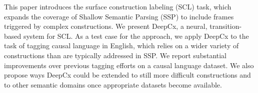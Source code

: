 This paper introduces the surface construction labeling (SCL) task, which expands the coverage of Shallow Semantic Parsing (SSP) to include frames triggered by complex constructions. We present DeepCx, a neural, transition-based system for SCL. As a test case for the approach, we apply DeepCx to the task of tagging causal language in English, which relies on a wider variety of constructions than are typically addressed in SSP. We report substantial improvements over previous tagging efforts on a causal language dataset. We also propose ways DeepCx could be extended to still more difficult constructions and to other semantic domains once appropriate datasets become available.
